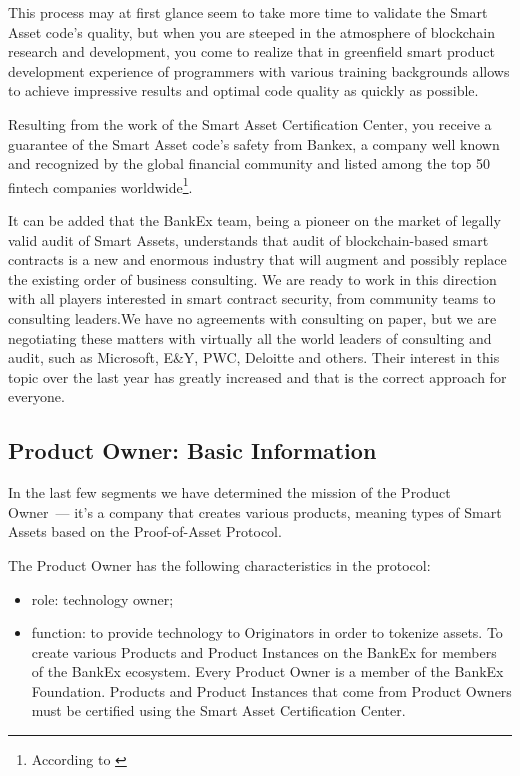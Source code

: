 \documentclass{article}
\begin{document}
\begin{multicols}{2}
This process may at first glance seem to take more time to validate the Smart Asset code's quality, but when you are steeped in the atmosphere of blockchain research and development, you come to realize that in greenfield smart product development experience of programmers with various training backgrounds allows to achieve impressive results and optimal code quality as quickly as possible.
	
Resulting from the work of the Smart Asset Certification Center, you receive a guarantee of the Smart Asset code's safety from Bankex, a company well known and recognized by the global financial community and listed among the top 50 fintech companies worldwide\footnote{According to \cite{top2017}}.

It can be added that the BankEx team, being a pioneer on the market of legally valid audit of Smart Assets, understands that audit of blockchain-based smart contracts is a new and enormous industry that will augment and possibly replace the existing order of business consulting. We are ready to work in this direction with all players interested in smart contract security, from community teams to consulting leaders.We have no agreements with consulting on paper, but we are negotiating these matters with virtually all the world leaders of consulting and audit, such as Microsoft, E\&Y, PWC, Deloitte and others. Their interest in this topic over the last year has greatly increased and that is the correct approach for everyone.

\subsection{Product Owner: Basic Information}

In the last few segments we have determined the mission of the Product Owner~--- it’s a company that creates various products, meaning types of Smart Assets based on the Proof-of-Asset Protocol.

The Product Owner has the following characteristics in the protocol:

\begin{itemize}
\item role: technology owner;
\item function: to provide technology to Originators in order to tokenize assets. To create various Products and Product Instances on the BankEx for members of the BankEx ecosystem. Every Product Owner is a member of the BankEx Foundation. Products and Product Instances that come from Product Owners must be  certified using the Smart Asset Certification Center.
\end{itemize}


\end{multicols}
\end{document}

